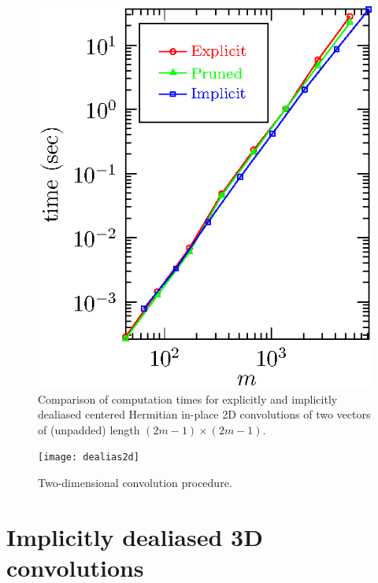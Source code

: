 \documentclass[final]{siamltex}
\begin{document}
\begin{figure}[htbp]
\begin{center}
\begin{minipage}{0.49\linewidth}
\begin{center}
\label{timing2c}
\end{center}
\end{minipage}
%
\begin{minipage}{0.49\linewidth}
\begin{center}
\includegraphics{timing2r}
\caption{Comparison of computation times for explicitly and implicitly
dealiased centered Hermitian in-place 2D convolutions of two vectors of
(unpadded) length $(2m-1)\times (2m-1)$.}
\label{timing2r}
\end{center}
\end{minipage}
\end{center}
\end{figure}

\begin{figure}[htbp]
  \begin{center}
    \texttt{[image: dealias2d]}
    \caption{Two-dimensional convolution procedure.}
    \label{dealias2d}
  \end{center}
\end{figure}

\section{Implicitly dealiased 3D convolutions}\label{3d}
\end{document}
